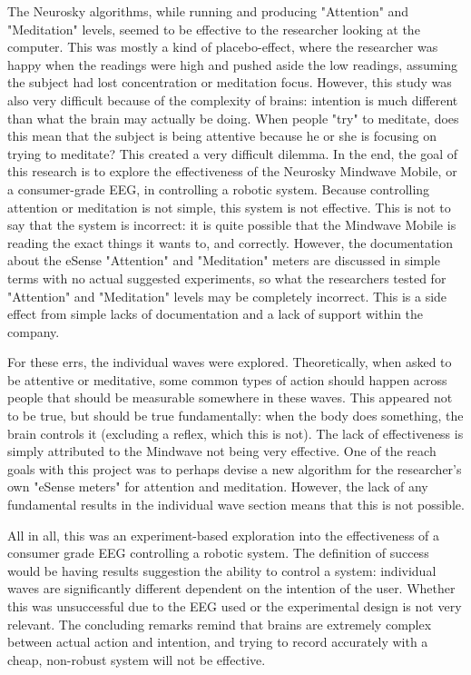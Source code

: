 \documentclass[journal]{IEEEtran}
\begin{document}
The Neurosky algorithms, while running and producing "Attention" and "Meditation" levels, seemed to be effective to the researcher looking at the computer. This was mostly a kind of placebo-effect, where the researcher was happy when the readings were high and pushed aside the low readings, assuming the subject had lost concentration or meditation focus. However, this study was also very difficult because of the complexity of brains: intention is much different than what the brain may actually be doing. When people "try" to meditate, does this mean that the subject is being attentive because he or she is focusing on trying to meditate? This created a very difficult dilemma. In the end, the goal of this research is to explore the effectiveness of the Neurosky Mindwave Mobile, or a consumer-grade EEG, in controlling a robotic system. Because controlling attention or meditation is not simple, this system is not effective. This is not to say that the system is incorrect: it is quite possible that the Mindwave Mobile is reading the exact things it wants to, and correctly. However, the documentation about the eSense "Attention" and "Meditation" meters are discussed in simple terms with no actual suggested experiments, so what the researchers tested for "Attention" and "Meditation" levels may be completely incorrect. This is a side effect from simple lacks of documentation and a lack of support within the company. \par

For these errs, the individual waves were explored. Theoretically, when asked to be attentive or meditative, some common types of action should happen across people that should be measurable somewhere in these waves. This appeared not to be true, but should be true fundamentally: when the body does something, the brain controls it (excluding a reflex, which this is not). The lack of effectiveness is simply attributed to the Mindwave not being very effective. One of the reach goals with this project was to perhaps devise a new algorithm for the researcher's own "eSense meters" for attention and meditation. However, the lack of any fundamental results in the individual wave section means that this is not possible. \par

All in all, this was an experiment-based exploration into the effectiveness of a consumer grade EEG controlling a robotic system. The definition of success would be having results suggestion the ability to control a system: individual waves are significantly different dependent on the intention of the user. Whether this was unsuccessful due to the EEG used or the experimental design is not very relevant. The concluding remarks remind that brains are extremely complex between actual action and intention, and trying to record accurately with a cheap, non-robust system will not be effective. \par
\end{document}
